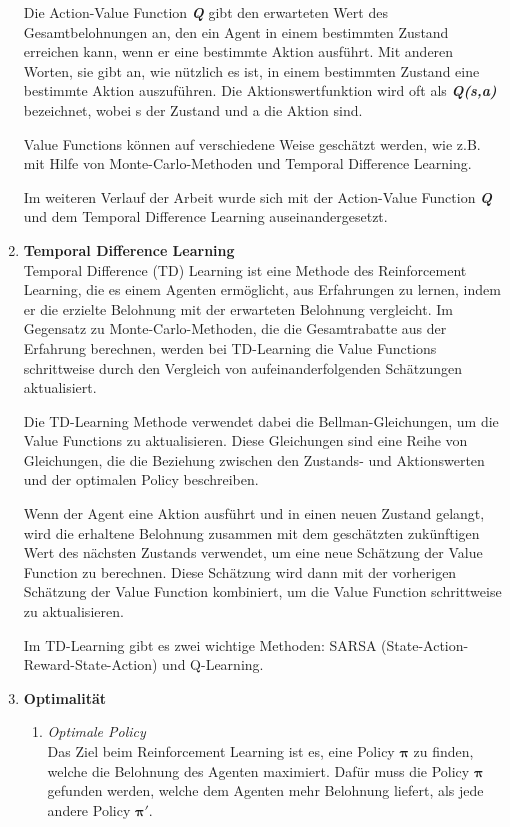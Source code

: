\begin{enumerate}
    Die Action-Value Function \textbf{\textit{Q}} gibt den erwarteten Wert des Gesamtbelohnungen an, den ein Agent in einem bestimmten Zustand erreichen kann, wenn er eine bestimmte Aktion ausführt. Mit anderen Worten, sie gibt an, wie nützlich es ist, in einem bestimmten Zustand eine bestimmte Aktion auszuführen. Die Aktionswertfunktion wird oft als \textbf{\textit{Q(s,a)}} bezeichnet, wobei s der Zustand und a die Aktion sind.
    
    Value Functions können auf verschiedene Weise geschätzt werden, wie z.B. mit Hilfe von Monte-Carlo-Methoden und Temporal Difference Learning.

    Im weiteren Verlauf der Arbeit wurde sich mit der Action-Value Function \textbf{\textit{Q}} und dem Temporal Difference Learning auseinandergesetzt.
    
    \item \textbf{Temporal Difference Learning}\\
    Temporal Difference (TD) Learning \cite{mediumTemporalDifference} ist eine Methode des Reinforcement Learning, die es einem Agenten ermöglicht, aus Erfahrungen zu lernen, indem er die erzielte Belohnung mit der erwarteten Belohnung vergleicht. Im Gegensatz zu Monte-Carlo-Methoden, die die Gesamtrabatte aus der Erfahrung berechnen, werden bei TD-Learning die Value Functions schrittweise durch den Vergleich von aufeinanderfolgenden Schätzungen aktualisiert.

    Die TD-Learning Methode verwendet dabei die Bellman-Gleichungen, um die Value Functions zu aktualisieren. Diese Gleichungen sind eine Reihe von Gleichungen, die die Beziehung zwischen den Zustands- und Aktionswerten und der optimalen Policy beschreiben.

    Wenn der Agent eine Aktion ausführt und in einen neuen Zustand gelangt, wird die erhaltene Belohnung zusammen mit dem geschätzten zukünftigen Wert des nächsten Zustands verwendet, um eine neue Schätzung der Value Function zu berechnen. Diese Schätzung wird dann mit der vorherigen Schätzung der Value Function kombiniert, um die Value Function schrittweise zu aktualisieren.

    Im TD-Learning gibt es zwei wichtige Methoden: SARSA (State-Action-Reward-State-Action) und Q-Learning.

    \item \textbf{Optimalität}\\
    \begin{enumerate}
        \item \textit{Optimale Policy}\\
        Das Ziel beim Reinforcement Learning ist es, eine Policy {$\bm{\pi}$} zu finden, welche die Belohnung des Agenten maximiert. Dafür muss die Policy {$\bm{\pi}$} gefunden werden, welche dem Agenten mehr Belohnung liefert, als jede andere Policy {$\bm{\pi'}$}.
        

\end{enumerate}
\end{enumerate}
